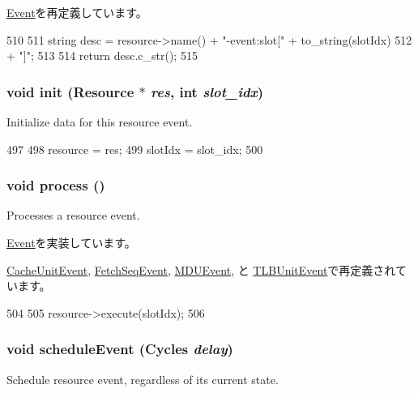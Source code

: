 \hyperlink{classEvent_a130ddddf003422b413e2e891b1b80e8f}{Event}を再定義しています。


\begin{DoxyCode}
510 {
511     string desc = resource->name() + "-event:slot[" + to_string(slotIdx)
512         + "]";
513 
514     return desc.c_str();
515 }
\end{DoxyCode}
\hypertarget{classResourceEvent_ac5f8be30d21fb73f191f9e7319c55bb4}{
\subsubsection[{init}]{\setlength{\rightskip}{0pt plus 5cm}void init ({\bf Resource} $\ast$ {\em res}, \/  int {\em slot\_\-idx})}}
\label{classResourceEvent_ac5f8be30d21fb73f191f9e7319c55bb4}
Initialize data for this resource event. 


\begin{DoxyCode}
497 {
498     resource = res;
499     slotIdx = slot_idx;
500 }
\end{DoxyCode}
\hypertarget{classResourceEvent_a2e9c5136d19b1a95fc427e0852deab5c}{
\subsubsection[{process}]{\setlength{\rightskip}{0pt plus 5cm}void process ()}}
\label{classResourceEvent_a2e9c5136d19b1a95fc427e0852deab5c}
Processes a resource event. 

\hyperlink{classEvent_a142b75b68a6291400e20fb0dd905b1c8}{Event}を実装しています。

\hyperlink{classCacheUnitEvent_a2e9c5136d19b1a95fc427e0852deab5c}{CacheUnitEvent}, \hyperlink{classFetchSeqUnit_1_1FetchSeqEvent_a2e9c5136d19b1a95fc427e0852deab5c}{FetchSeqEvent}, \hyperlink{classMDUEvent_a2e9c5136d19b1a95fc427e0852deab5c}{MDUEvent}, と \hyperlink{classTLBUnitEvent_a2e9c5136d19b1a95fc427e0852deab5c}{TLBUnitEvent}で再定義されています。


\begin{DoxyCode}
504 {
505     resource->execute(slotIdx);
506 }
\end{DoxyCode}
\hypertarget{classResourceEvent_af53dcbdc9da1cc615d43ff3bd2b4162c}{
\subsubsection[{scheduleEvent}]{\setlength{\rightskip}{0pt plus 5cm}void scheduleEvent ({\bf Cycles} {\em delay})}}
\label{classResourceEvent_af53dcbdc9da1cc615d43ff3bd2b4162c}
Schedule resource event, regardless of its current state. 



